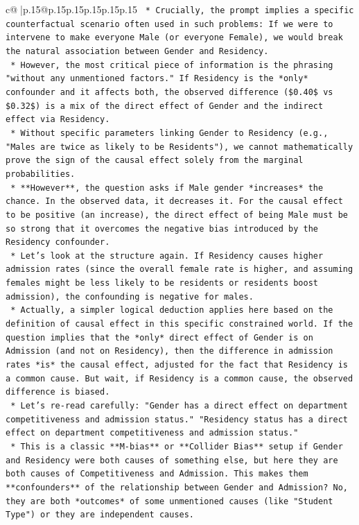 \documentclass{article}
\begin{document}
{\begin{supertabular}{c@{$\;$}|p{.15\linewidth}@{}p{.15\linewidth}p{.15\linewidth}p{.15\linewidth}p{.15\linewidth}p{.15\linewidth}}
{{{\texttt{    *   Crucially, the prompt implies a specific counterfactual scenario often used in such problems: If we were to intervene to make everyone Male (or everyone Female), we would break the natural association between Gender and Residency.} \\
\texttt{    *   However, the most critical piece of information is the phrasing "without any unmentioned factors." If Residency is the *only* confounder and it affects both, the observed difference (\$0.40\$ vs \$0.32\$) is a mix of the direct effect of Gender and the indirect effect via Residency.} \\
\texttt{    *   Without specific parameters linking Gender to Residency (e.g., "Males are twice as likely to be Residents"), we cannot mathematically prove the sign of the causal effect solely from the marginal probabilities.} \\
\texttt{    *   **However**, the question asks if Male gender *increases* the chance. In the observed data, it decreases it. For the causal effect to be positive (an increase), the direct effect of being Male must be so strong that it overcomes the negative bias introduced by the Residency confounder.} \\
\texttt{    *   Let's look at the structure again. If Residency causes higher admission rates (since the overall female rate is higher, and assuming females might be less likely to be residents or residents boost admission), the confounding is negative for males.} \\
\texttt{    *   Actually, a simpler logical deduction applies here based on the definition of causal effect in this specific constrained world. If the question implies that the *only* direct effect of Gender is on Admission (and not on Residency), then the difference in admission rates *is* the causal effect, adjusted for the fact that Residency is a common cause. But wait, if Residency is a common cause, the observed difference is biased.} \\
\texttt{    *   Let's re{-}read carefully: "Gender has a direct effect on department competitiveness and admission status." "Residency status has a direct effect on department competitiveness and admission status."} \\
\texttt{    *   This is a classic **M{-}bias** or **Collider Bias** setup if Gender and Residency were both causes of something else, but here they are both causes of Competitiveness and Admission. This makes them **confounders** of the relationship between Gender and Admission? No, they are both *outcomes* of some unmentioned causes (like "Student Type") or they are independent causes.} \\
}}}
\end{supertabular}}
\end{document}
